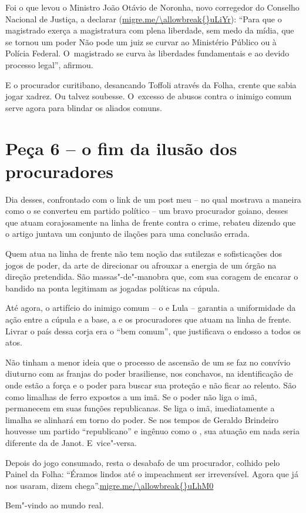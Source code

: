 Foi o que levou o Ministro João Otávio de Noronha, novo corregedor do
Conselho Nacional de Justiça, a declarar (\url{migre.me/\allowbreak{}uLiYr}):
``Para que o magistrado exerça a magistratura com plena liberdade, sem
medo da mídia, que se tornou um poder \redondo{[…]} Não pode um juiz se
curvar ao Ministério Público ou à Polícia Federal. O~magistrado se curva
às liberdades fundamentais e ao devido processo legal'', afirmou.

E o procurador curitibano, desancando Toffoli através da Folha, crente
que sabia jogar xadrez. Ou talvez soubesse. O~excesso de abusos contra o
inimigo comum serve agora para blindar os aliados comuns.

\section{Peça 6 -- o fim da ilusão dos procuradores}

Dia desses, confrontado com o link de um post meu -- no qual mostrava a
maneira como o  se converteu em partido político -- um bravo
procurador goiano, desses que atuam corajosamente na linha de frente
contra o crime, rebateu dizendo que o artigo juntava um conjunto de
ilações para uma conclusão errada.

Quem atua na linha de frente não tem noção das sutilezas e sofisticações
dos jogos de poder, da arte de direcionar ou afrouxar a energia de um
órgão na direção pretendida. São massas"-de"-manobra que, com sua coragem
de encarar o bandido na ponta legitimam as jogadas políticas na cúpula.

Até agora, o artifício do inimigo comum -- o  e Lula -- garantia a
uniformidade da ação entre a cúpula e a base, a  e os procuradores
que atuam na linha de frente. Livrar o país dessa corja era o ``bem
comum'', que justificava o endosso a todos os atos.

Não tinham a menor ideia que o processo de ascensão de um  se faz no
convívio diuturno com as franjas do poder brasiliense, nos conchavos, na
identificação de onde estão a força e o poder para buscar sua proteção e
não ficar ao relento. São como limalhas de ferro expostos a um imã. Se o
poder não liga o imã, permanecem em suas funções republicanas. Se liga o
imã, imediatamente a limalha se alinhará em torno do poder. Se nos
tempos de Geraldo Brindeiro houvesse um partido ``republicano'' e
ingênuo como o , sua atuação em nada seria diferente da de Janot. E~vice"-versa.

Depois do jogo consumado, resta o desabafo de um procurador, colhido
pelo Painel da Folha: ``Éramos lindos até o impeachment ser
irreversível. Agora que já nos usaram, dizem
chega''.\url{migre.me/\allowbreak{}uLhM0}

Bem"-vindo ao mundo real.
